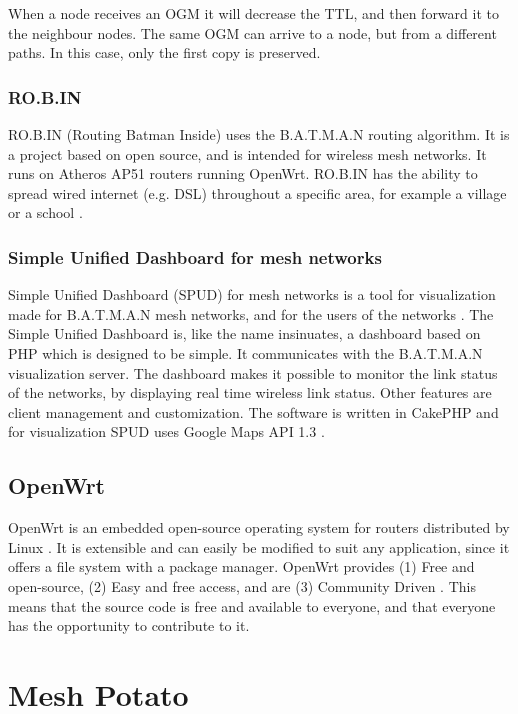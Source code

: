 When a node receives an OGM it will decrease the TTL, and then forward it to the neighbour nodes. The same OGM can arrive to a node, but from a different paths. In this case, only the first copy is preserved. 

\subsubsection{RO.B.IN}
RO.B.IN (Routing Batman Inside) uses the B.A.T.M.A.N routing algorithm. It is a project based on open source, and is intended for wireless mesh networks. It runs on Atheros AP51 routers running OpenWrt. RO.B.IN has the ability to spread wired internet (e.g. DSL) throughout a specific area, for example a village or a school \cite{robin}. 
 

\subsubsection{Simple Unified Dashboard for mesh networks}
Simple Unified Dashboard (SPUD) for mesh networks is a tool for visualization made for B.A.T.M.A.N mesh networks, and for the users of the networks \cite{spud}. The Simple Unified Dashboard is, like the name insinuates, a dashboard based on PHP which is designed to be simple. It communicates with the B.A.T.M.A.N visualization server. The dashboard makes it possible to monitor the link status of the networks, by displaying real time wireless link status. Other features are client management and customization. The software is written in CakePHP and for visualization SPUD uses Google Maps API 1.3 \cite{spud}.


\subsection{OpenWrt}
OpenWrt is an embedded open-source operating system for routers distributed by Linux \cite{openwrt}. It is extensible and can easily be modified to suit any application, since it offers a file system with a package manager. OpenWrt provides (1) Free and open-source, (2) Easy and free access, and are (3) Community Driven \cite{openwrt}. This means that the source code is free and available to everyone, and that everyone has the opportunity to contribute to it. 

\section{Mesh Potato}

